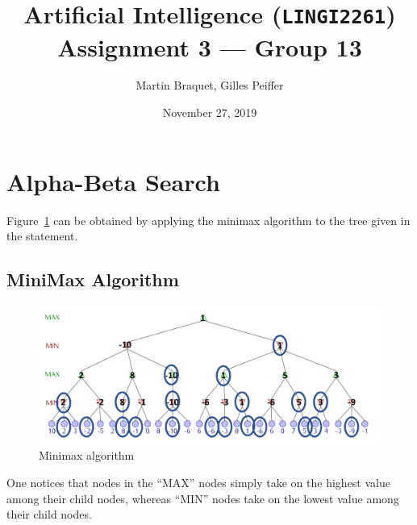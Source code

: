 \documentclass[journal,onecolumn]{IEEEtran}
\title{Artificial Intelligence (\texttt{LINGI2261}) \\ Assignment 3 --- Group 13}
\author{Martin Braquet, Gilles Peiffer}
\date{November 27, 2019}
\begin{document}
\maketitle

\section{Alpha-Beta Search}
Figure~\ref{fig:minimax} can be obtained by applying the minimax algorithm to the tree given in the statement.
\subsection{MiniMax Algorithm}
\begin{figure}[H]
 \centering
 \includegraphics[width=\textwidth]{img/MiniMax.png}
 \caption{Minimax algorithm}
 \label{fig:minimax}
\end{figure}
One notices that nodes in the ``MAX'' nodes simply take on the highest value among their child nodes, whereas ``MIN'' nodes take on the lowest value among their child nodes.
\end{document}
